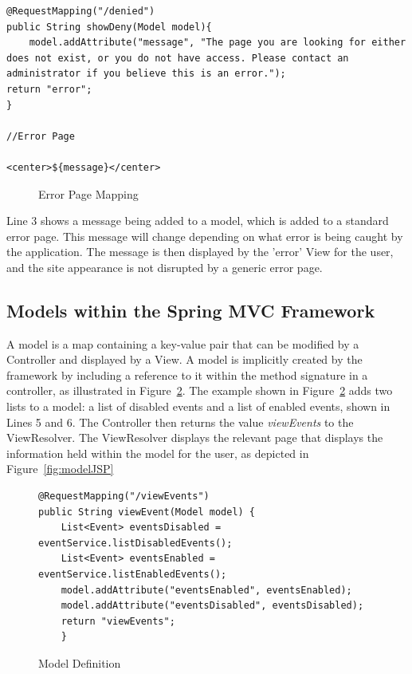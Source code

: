\begin{lstlisting}
@RequestMapping("/denied")
public String showDeny(Model model){
	model.addAttribute("message", "The page you are looking for either does not exist, or you do not have access. Please contact an administrator if you believe this is an error.");
return "error";
}

//Error Page

<center>${message}</center>
\end{lstlisting}
\begin{figure}[H]
\caption{Error Page Mapping}
\label{fig:viewDenied}
\end{figure}

Line 3 shows a message being added to a model, which is added to a standard error page. This message will change depending on what error is being caught by the application. The message is then displayed by the 'error' View for the user, and the site appearance is not disrupted by a generic error page.

\subsection{Models within the Spring MVC Framework}

A model is a map containing a key-value pair that can be modified by a Controller and displayed by a View. A model is implicitly created by the framework by including a reference to it within the method signature in a controller, as illustrated in Figure~\ref{fig:modelDefine}. The example shown in Figure~\ref{fig:modelDefine} adds two lists to a model: a list of disabled events and a list of enabled events, shown in Lines 5 and 6. The Controller then returns the value \textit{viewEvents} to the ViewResolver. The ViewResolver displays the relevant page that displays the information held within the model for the user, as depicted in Figure~\ref{fig:modelJSP}

\begin{figure}[H]
\begin{lstlisting}
@RequestMapping("/viewEvents")
public String viewEvent(Model model) {
	List<Event> eventsDisabled = eventService.listDisabledEvents();
	List<Event> eventsEnabled = eventService.listEnabledEvents();
	model.addAttribute("eventsEnabled", eventsEnabled);
	model.addAttribute("eventsDisabled", eventsDisabled);
    return "viewEvents";
	}
\end{lstlisting}
\caption{Model Definition}
\label{fig:modelDefine}
\end{figure}

